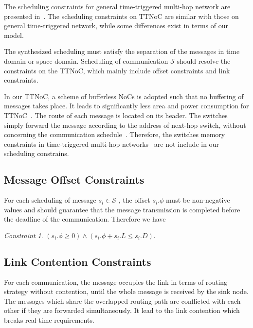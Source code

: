 \documentclass[journal]{IEEEtran}
\newcommand{\calS}{\mathcal{S}}
\theoremstyle{remark}
\newtheorem{constraint}{Constraint}
\begin{document}
The scheduling constraints for general time-triggered multi-hop
network are presented in~\cite{DBLP:conf/rtss/Steiner10}. The
scheduling constraints on TTNoC are similar with those on general
time-triggered network, while some differences exist in terms of our
model.

The synthesized scheduling must satisfy the separation
of the messages in time domain or space domain.
Scheduling of communication $\calS$ should resolve the constraints on
the TTNoC, which mainly include offset constraints and link constraints.

In our TTNoC, a scheme of bufferless NoCs is adopted such that no buffering of messages takes place. 
It leads to significantly less area and power consumption for TTNoC~\cite{DBLP:journals/tpds/ShpinerKLCK15}.
The route of each message is located on its header.  
The switches simply forward the message according to the address of next-hop
switch, without concerning the communication schedule~\cite{DBLP:conf/rtcsa/PaukovitsK08}. 
Therefore, the switches memory constraints in time-triggered multi-hop networks~\cite{DBLP:conf/rtss/2010} are not include in our scheduling constrains. 

\subsection{Message Offset Constraints}
For each scheduling of message $s_{i}\in\calS$ , the offset $s_i.\phi$
must be non-negative values and should guarantee that the message
transmission is completed before the deadline of the
communication. Therefore we have
\begin{constraint}
\label{c:offset}
$(s_i.\phi \geq 0) \wedge (s_i.\phi + s_i.L \leq s_i.D)$.
\end{constraint}

\subsection{Link Contention Constraints}
For each communication, the message occupies the link in terms of routing strategy without contention,
until the whole message is received by the sink node. 
The messages which share the overlapped routing path are conflicted with each other if they are forwarded  simultaneously.
It lead to the link contention which breaks real-time requirements. 
\end{document}

